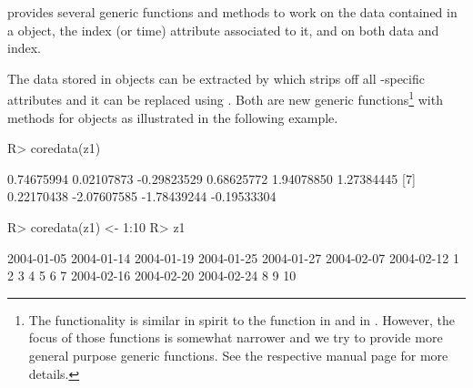 \documentclass[article,nojss]{jss}
\begin{document}
 provides several generic functions and methods
to work on the data contained in a  object, the
index (or time) attribute associated to it, and on both data and
index.

The data stored in  objects can be extracted by
 which strips off all -specific attributes and 
it can be replaced using . Both are new generic
functions\footnote{The  functionality is similar in spirit to the 
function in  and  in . However, the 
focus of those functions is somewhat narrower and we try to provide 
more general purpose generic functions. See the respective manual
page for more details.}
with methods for  objects as illustrated in the following
example.
\begin{Schunk}
\begin{Sinput}
R> coredata(z1)
\end{Sinput}
\begin{Soutput}
 [1]  0.74675994  0.02107873 -0.29823529  0.68625772  1.94078850  1.27384445
 [7]  0.22170438 -2.07607585 -1.78439244 -0.19533304
\end{Soutput}
\begin{Sinput}
R> coredata(z1) <- 1:10
R> z1
\end{Sinput}
\begin{Soutput}
2004-01-05 2004-01-14 2004-01-19 2004-01-25 2004-01-27 2004-02-07 2004-02-12 
         1          2          3          4          5          6          7 
2004-02-16 2004-02-20 2004-02-24 
         8          9         10 
\end{Soutput}
\end{Schunk}
\end{document}
